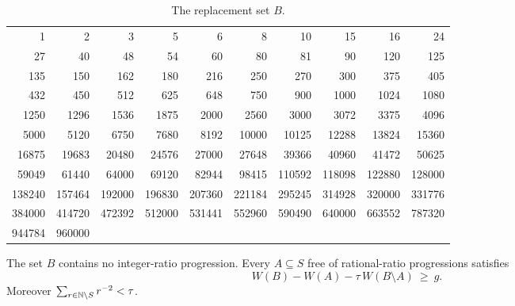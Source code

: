 \begin{table}[htbp]\centering\small
\caption{The replacement set $B$.}\label{gpi:tab:replacement}
\begin{tabular}{rrrrrrrrrr}\toprule
1&2&3&5&6&8&10&15&16&24\\
27&40&48&54&60&80&81&90&120&125\\
135&150&162&180&216&250&270&300&375&405\\
432&450&512&625&648&750&900&1000&1024&1080\\
1250&1296&1536&1875&2000&2560&3000&3072&3375&4096\\
5000&5120&6750&7680&8192&10000&10125&12288&13824&15360\\
16875&19683&20480&24576&27000&27648&39366&40960&41472&50625\\
59049&61440&64000&69120&82944&98415&110592&118098&122880&128000\\
138240&157464&192000&196830&207360&221184&295245&314928&320000&331776\\
384000&414720&472392&512000&531441&552960&590490&640000&663552&787320\\
944784&960000&&&&&&&&\\\bottomrule
\end{tabular}
\end{table}

\begin{lemma}\label{gpi:lem:exchange}
The set $B$ contains no integer-ratio progression. Every $A\subseteq S$ free of
rational-ratio progressions satisfies
\begin{equation}\label{gpi:eq:exchange}
 W(B)-W(A)-\tau\,W(B\setminus A)\ \ge\ g .
\end{equation}
Moreover $\sum_{r\in\mathbb{N}\setminus S}r^{-2}<\tau$.
\end{lemma}


